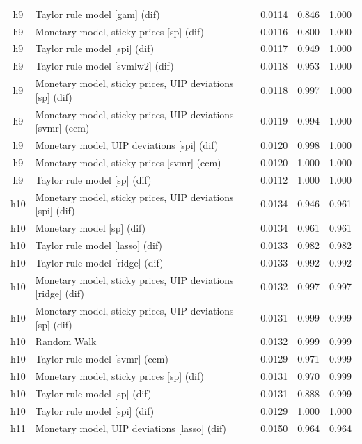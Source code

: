 \begin{ThreePartTable}
\begin{longtable}[t]{cp{5.5cm}ccc}
h9 & \raggedright Taylor rule model [gam] (dif) & 0.0114 & 0.846 & 1.000\\
h9 & \raggedright Monetary model, sticky prices [sp] (dif) & 0.0116 & 0.800 & 1.000\\
h9 & \raggedright Taylor rule model [spi] (dif) & 0.0117 & 0.949 & 1.000\\
h9 & \raggedright Taylor rule model [svmlw2] (dif) & 0.0118 & 0.953 & 1.000\\
h9 & \raggedright Monetary model, sticky prices, UIP deviations [sp] (dif) & 0.0118 & 0.997 & 1.000\\
h9 & \raggedright Monetary model, sticky prices, UIP deviations [svmr] (ecm) & 0.0119 & 0.994 & 1.000\\
h9 & \raggedright Monetary model, UIP deviations [spi] (dif) & 0.0120 & 0.998 & 1.000\\
h9 & \raggedright Monetary model, sticky prices [svmr] (ecm) & 0.0120 & 1.000 & 1.000\\
h9 & \raggedright Taylor rule model [sp] (dif) & 0.0112 & 1.000 & 1.000\\
\addlinespace
h10 & \raggedright Monetary model, sticky prices, UIP deviations [spi] (dif) & 0.0134 & 0.946 & 0.961\\
h10 & \raggedright Monetary model [sp] (dif) & 0.0134 & 0.961 & 0.961\\
h10 & \raggedright Taylor rule model [lasso] (dif) & 0.0133 & 0.982 & 0.982\\
h10 & \raggedright Taylor rule model [ridge] (dif) & 0.0133 & 0.992 & 0.992\\
h10 & \raggedright Monetary model, sticky prices, UIP deviations [ridge] (dif) & 0.0132 & 0.997 & 0.997\\
h10 & \raggedright Monetary model, sticky prices, UIP deviations [sp] (dif) & 0.0131 & 0.999 & 0.999\\
h10 & \raggedright Random Walk & 0.0132 & 0.999 & 0.999\\
h10 & \raggedright Taylor rule model [svmr] (ecm) & 0.0129 & 0.971 & 0.999\\
h10 & \raggedright Monetary model, sticky prices [sp] (dif) & 0.0131 & 0.970 & 0.999\\
h10 & \raggedright Taylor rule model [sp] (dif) & 0.0131 & 0.888 & 0.999\\
h10 & \raggedright Taylor rule model [spi] (dif) & 0.0129 & 1.000 & 1.000\\
\addlinespace
h11 & \raggedright Monetary model, UIP deviations [lasso] (dif) & 0.0150 & 0.964 & 0.964\\

\end{longtable}
\end{ThreePartTable}
